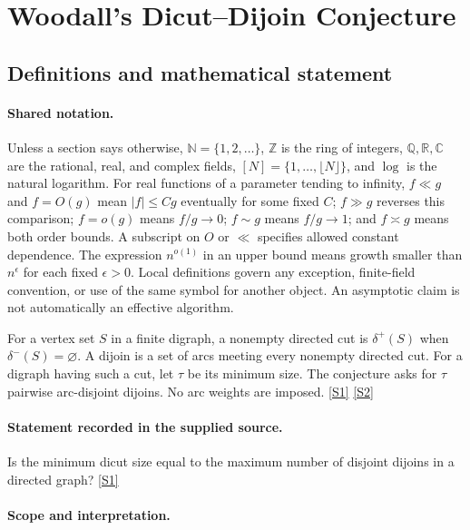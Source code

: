 \documentclass[11pt,a4paper]{article}
\newcommand{\N}{\mathbb{N}}
\newcommand{\Z}{\mathbb{Z}}
\newcommand{\Q}{\mathbb{Q}}
\newcommand{\R}{\mathbb{R}}
\newcommand{\C}{\mathbb{C}}
\newcommand{\sref}[2]{\hyperlink{source:#1:#2}{[S#2]}}
\begin{document}
\section{Woodall’s Dicut--Dijoin Conjecture}\label{statement}


\subsection{Definitions and mathematical statement}

\paragraph{Shared notation.}Unless a section says otherwise, $\N=\{1,2,\ldots\}$,
$\Z$ is the ring of integers, $\Q,\R,\C$ are the rational, real, and complex
fields, $[N]=\{1,\ldots,\lfloor N\rfloor\}$, and $\log$ is the natural
logarithm. For real functions of a parameter tending to infinity,
$f\ll g$ and $f=O(g)$ mean $|f|\leq Cg$ eventually for some fixed $C$;
$f\gg g$ reverses this comparison; $f=o(g)$ means $f/g\to0$;
$f\sim g$ means $f/g\to1$; and $f\asymp g$ means both order bounds.
A subscript on $O$ or $\ll$ specifies allowed constant dependence.
The expression $n^{o(1)}$ in an upper bound means growth smaller than
$n^\epsilon$ for each fixed $\epsilon>0$. Local definitions govern any
exception, finite-field convention, or use of the same symbol for another
object. An asymptotic claim is not automatically an effective algorithm.



For a vertex set $S$ in a finite digraph, a nonempty directed cut is $\delta^+(S)$ when $\delta^-(S)=\varnothing$. A dijoin is a set of arcs meeting every nonempty directed cut. For a digraph having such a cut, let $\tau$ be its minimum size. The conjecture asks for $\tau$ pairwise arc-disjoint dijoins. No arc weights are imposed. \sref{statement}{1} \sref{statement}{2}

\paragraph{Statement recorded in the supplied source.}
Is the minimum dicut size equal to the maximum number of disjoint dijoins in a directed graph? \sref{statement}{1}

\paragraph{Scope and interpretation.}
\end{document}
